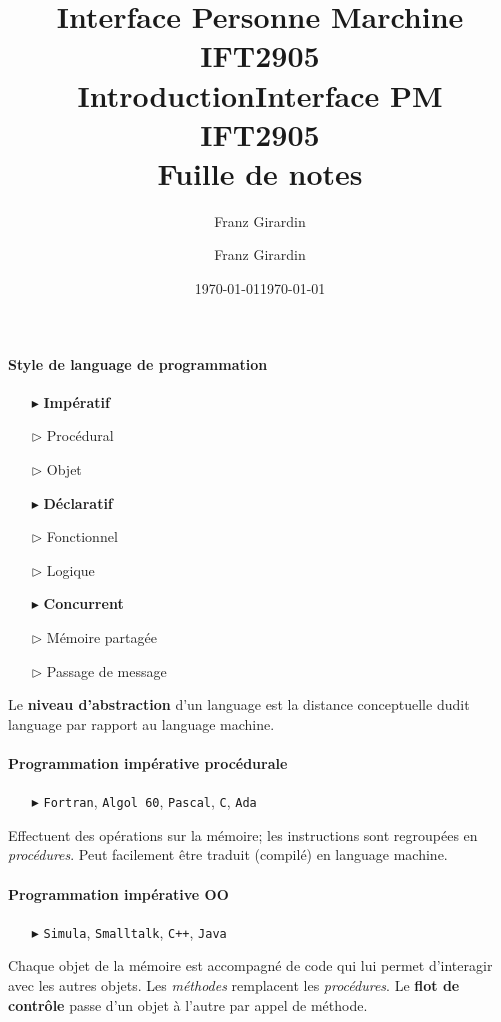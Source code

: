 \documentclass{report}
\title{\Huge{Interface Personne Marchine}\\{IFT2905}\\{\textbf{Introduction}}}
\author{\huge{Franz Girardin}}
\date{\today}
\title{\Huge{Interface PM}\\{IFT2905}\\{\textbf{Fuille de notes}}}
\author{\huge{Franz Girardin}}
\date{\today}
\begin{document}
\maketitle
\pagebreak
\tableofcontents
\pagebreak
\begin{multicols*}{3}


    \footnotesize
    \paragraph{Style de language de programmation} 
    
    \begin{itemize}
        \item [$\blacktriangleright$ ] \textbf{Impératif}   
        \item [$\rhd$ ] Procédural
        \item [$\rhd$ ] Objet 
        \item [$\blacktriangleright$ ] \textbf{Déclaratif}  
        \item [$\rhd$ ] Fonctionnel 
        \item [$\rhd$ ] Logique 
        \item [$\blacktriangleright$ ] \textbf{Concurrent}  
        \item [$\rhd$ ] Mémoire partagée
        \item [$\rhd$ ] Passage de message
    \end{itemize}
    \noindent
    Le \textbf{niveau d'abstraction} d'un language est la distance conceptuelle 
    dudit language par rapport au language machine. 


    \paragraph{Programmation impérative procédurale}
    \begin{itemize}
        \item [$\blacktriangleright$ ]\texttt{Fortran}, \texttt{Algol 60}, \texttt{Pascal}, \texttt{C}, \texttt{Ada}          
    \end{itemize}
    Effectuent des opérations sur la mémoire; les instructions sont regroupées
    en \textit{procédures}. Peut facilement être traduit (compilé) en
    language machine.   


    \paragraph{Programmation impérative OO}
    \begin{itemize}
        \item [$\blacktriangleright$ ] \texttt{Simula}, \texttt{Smalltalk}, \texttt{C++}, \texttt{Java}
    \end{itemize}
    Chaque objet de la mémoire est accompagné de code qui lui permet d'interagir
    avec les autres objets. Les \textit{méthodes} remplacent les
    \textit{procédures}. Le \textbf{flot de contrôle} passe d'un objet à l'autre
    par appel de méthode. 
    


\end{multicols*}
\end{document}
